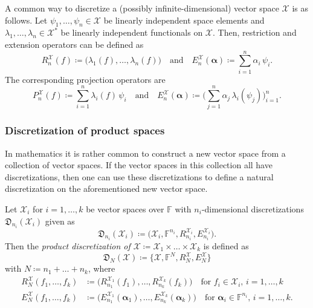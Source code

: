 \documentclass[a4paper]{paper}
\newcommand*{\SPC}[1]{{\ensuremath{\mathscr{#1}}}}
\newcommand*{\SPCX}{\SPC{X}}
\newcommand{\FIELD}{{\ensuremath{\mathbb{F}}}}
\newcommand*{\EXT}[2]{\ensuremath{E_{#1}^{#2}}}
\newcommand*{\REST}[2]{\ensuremath{R_{#1}^{#2}}}
\newcommand*{\PROJ}[2]{\ensuremath{P_{#1}^{#2}}}
\newcommand*{\RnX}{{\ensuremath{\REST{n}{\SPC{X}}}}}
\newcommand*{\EnX}{{\ensuremath{\EXT{n}{\SPC{X}}}}}
\newcommand*{\PnX}{{\ensuremath{\PROJ{n}{\SPCX}}}}
\newcommand*{\DISCR}[2]{{\ensuremath{\mathfrak{D}_{#2}(#1)}}}
\DeclareMathOperator{\DEFEQ}{{\coloneqq}}
\newcommand{\valpha}{\boldsymbol{\alpha}}
\begin{document}
\begin{examp}
 A common way to discretize a (possibly infinite-dimensional) vector space $\SPCX$ is as follows. Let 
 $\psi_1, \dots, \psi_n \in \SPCX$ be linearly independent space elements and 
 $\lambda_1, \dots, \lambda_n \in \SPCX^*$ be linearly independent functionals on $\SPCX$. Then, restriction and 
 extension operators can be defined as
 \begin{equation*}
  \RnX(f) \DEFEQ  \big( \lambda_1(f), \dots, \lambda_n(f) \big) 
  \quad \text{and} \quad
  \EnX(\valpha) \DEFEQ  \sum_{i=1}^n \alpha_i\, \psi_i.
 \end{equation*}
 The corresponding projection operators are
 \begin{equation*}
  \PnX(f) \DEFEQ  \sum_{i=1}^n \lambda_i(f)\, \psi_i
  \quad \text{and} \quad
  \EnX(\valpha) \DEFEQ  \bigg( \sum_{j=1}^n \alpha_j\, \lambda_i(\psi_j) \bigg)_{i=1}^n.
 \end{equation*}

\end{examp}


\subsubsection{Discretization of product spaces}
\label{subsubsec:discr:space:prod}

In mathematics it is rather common to construct a new vector space from a collection of vector spaces. If the vector 
spaces in this collection all have discretizations, then one can use these discretizations to define a natural 
discretization on the aforementioned new vector space.

\begin{definition}
 \label{def:discr:space:prod:prod_space_discr}
 Let $\SPCX_i$ for $i=1,\dots,k$ be vector spaces over $\FIELD$ with $n_i$-dimensional discretizations 
 $\DISCR{\SPCX_i}{n_i}$ given as
 \begin{equation*}
  \DISCR{\SPCX_i}{n_i} \DEFEQ  \bigl( \SPCX_i, \FIELD^{n_i}, \REST{n_i}{\SPCX_i}, \EXT{n_i}{\SPCX_i} \bigr). 
 \end{equation*}
 Then the \emph{product discretization of $\SPCX \DEFEQ  \SPCX_1 \times \dots \times \SPCX_k$} is defined as 
 \begin{equation*}
  \DISCR{\SPCX}{N} \DEFEQ \{\SPCX, \FIELD^N, \REST{N}{\SPCX}, \EXT{N}{\SPCX} \}
 \end{equation*}
 with $N \DEFEQ  n_1 + \dots + n_k$, where
 \begin{align*}
  \REST{N}{\SPCX}(f_1,\dots,f_k) &\DEFEQ  \bigl( \REST{n_1}{\SPCX_1}(f_1),\dots,\REST{n_k}{\SPCX_k}(f_k) \bigr)
  \quad\text{for $f_i\in \SPCX_i$, $i=1,\dots,k$} \\
  \EXT{N}{\SPCX}(f_1,\dots,f_k) &\DEFEQ  \bigl( \EXT{n_1}{\SPCX_1}(\valpha_1),\dots,\EXT{n_k}{\SPCX_k}(\valpha_k) 
  \bigr)
  \quad\text{for $\valpha_i\in \FIELD^{n_i}$, $i=1,\dots,k$.}
 \end{align*}
\end{definition}
\end{document}
